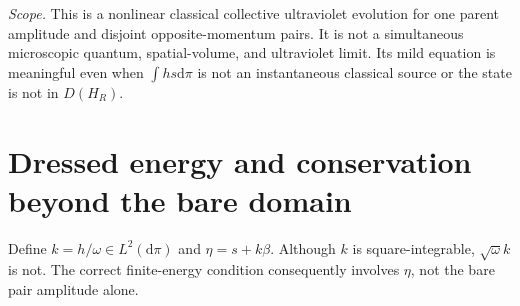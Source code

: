 \documentclass[11pt,a4paper,oneside]{book}
\theoremstyle{plain}
\theoremstyle{definition}
\theoremstyle{remark}
\newcommand{\dd}{\mathrm d}
\newcommand{\scope}[1]{\par\smallskip\noindent\textit{Scope.} #1\par\smallskip}
\begin{document}
\scope{This is a nonlinear classical collective ultraviolet evolution
for one parent amplitude and disjoint opposite-momentum pairs.  It is
not a simultaneous microscopic quantum, spatial-volume, and ultraviolet
limit.  Its mild equation is meaningful even when $\int hs\dd\pi$ is
not an instantaneous classical source or the state is not in $D(H_R)$.}

\section{Dressed energy and conservation beyond the bare domain}
\label{sec:collective-dressed-energy}
Define $k=h/\omega\in L^2(\dd\pi)$ and $\eta=s+k\beta$.
Although $k$ is square-integrable, $\sqrt\omega k$ is not.  The correct
finite-energy condition consequently involves $\eta$, not the bare
pair amplitude alone.
\end{document}

